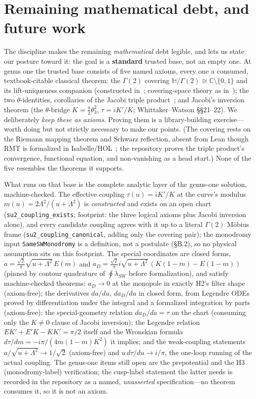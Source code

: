 \documentclass{article}
\theoremstyle{plain}
\theoremstyle{definition}
\numberwithin{equation}{section}
\newcommand{\C}{\mathbb{C}}
\newcommand{\HH}{\mathbb{H}}
\newcommand{\code}[1]{\texttt{#1}}
\begin{document}
\section{Remaining mathematical debt, and future work}

The discipline makes the remaining \emph{mathematical} debt legible, and lets us state our
posture toward it: the goal is a \textbf{standard} trusted base, not an empty one. At genus one
the trusted base consists of five named axioms, every one a consumed, textbook-citable classical
theorem: the $\Gamma(2)$ covering $\HH/\Gamma(2)\cong\C\setminus\{0,1\}$ and its
lift-uniqueness companion (constructed in~\cite{Ahlfors1979}; covering-space theory as
in~\cite{Forster1981}); the two $\theta$-identities, corollaries of the Jacobi triple
product~\cite{WhittakerWatson1927}; and Jacobi's inversion theorem (the $\theta$-bridge
$K = \tfrac{\pi}{2}\theta_3^2$, $\tau = iK'/K$; Whittaker--Watson \S\S21--22). We
deliberately \emph{keep these as axioms}. Proving them is a library-building exercise---worth
doing but not strictly necessary to make our points. (The covering rests on the Riemann mapping
theorem and Schwarz reflection, absent from Lean though RMT is formalized in
Isabelle/HOL~\cite{PaulsonRiemannMapping}; the repository proves the triple product's
convergence, functional equation, and non-vanishing as a head start.) None of the five resembles
the theorems it supports.

\medskip
\noindent What runs on that base is the complete analytic layer of the genus-one solution,
machine-checked. The effective coupling $\tau(u) = iK'/K$ at the curve's modulus
$m(u) = 2\Lambda^2/(u+\Lambda^2)$ is \emph{constructed} and exists on an open chart
(\code{su2\_coupling\_exists}; footprint: the three logical axioms plus Jacobi inversion
alone), and every candidate coupling agrees with it up to a literal $\Gamma(2)$ M\"obius frame
(\code{su2\_coupling\_canonical}, adding only the covering pair); the monodromy input
\code{SameSWMonodromy} is a definition, not a postulate (\S B.2), so no physical assumption sits on
this footprint. The special coordinates are closed forms,
$a = \tfrac{\sqrt2}{\pi}\sqrt{u+\Lambda^2}\,E(m)$ and
$a_D = \tfrac{\sqrt2}{\pi}i\sqrt{u+\Lambda^2}\,(K(1-m)-E(1-m))$ (pinned by contour
quadrature of $\oint\lambda_{SW}$ before formalization), and satisfy machine-checked theorems:
$a_D \to 0$ at the monopole in exactly H2's filter shape (axiom-free); the derivatives
$da/du$, $da_D/du$ in closed form, from Legendre ODEs proved by differentiation under the
integral and a formalized integration by parts (axiom-free); the special-geometry relation
$da_D/da = \tau$ on the chart (consuming only the $K \neq 0$ clause of Jacobi inversion); the
Legendre relation $EK' + E'K - KK' = \pi/2$ itself and the Wronskian formula
$d\tau/dm = -i\pi/(4m(1-m)K^2)$ it implies; and the weak-coupling statements
$a/\sqrt{u+\Lambda^2} \to 1/\sqrt2$ (axiom-free) and $u\,d\tau/du \to i/\pi$, the
one-loop running of the actual coupling. The genus-one items still open are the prepotential
and the H3 (monodromy-label) verification; the cusp-label statement the latter needs is
recorded in the repository as a named, \emph{unasserted} specification---no theorem consumes
it, so it is not an axiom.
\end{document}
